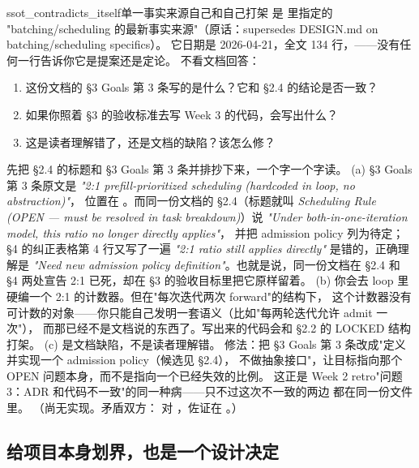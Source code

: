 \begin{checkpoint}{ssot_contradicts_itself}{单一事实来源自己和自己打架}
 是  里指定的
"batching/scheduling 的最新事实来源"（原话：supersedes DESIGN.md on batching/scheduling specifics）。
它日期是 2026-04-21，全文 134 行，——没有任何一行告诉你它是提案还是定论。
不看文档回答：
\begin{enumerate}[label=(\alph*)]
  \item 这份文档的 §3 Goals 第 3 条写的是什么？它和 §2.4 的结论是否一致？
  \item 如果你照着 §3 的验收标准去写 Week 3 的代码，会写出什么？
  \item 这是读者理解错了，还是文档的缺陷？该怎么修？
\end{enumerate}
\hint 先把 §2.4 的标题和 §3 Goals 第 3 条并排抄下来，一个字一个字读。
\ifshowanswers
\tcblower
\answer (a) §3 Goals 第 3 条原文是
\emph{"2:1 prefill-prioritized scheduling (hardcoded in loop, no abstraction)"}，
位置在 。而同一份文档的
§2.4（标题就叫 \emph{Scheduling Rule (OPEN --- must be resolved in task breakdown)}）说
\emph{"Under both-in-one-iteration model, this ratio no longer directly applies"}，
并把 admission policy 列为待定；§4 的纠正表格第 4 行又写了一遍
\emph{"2:1 ratio still applies directly"} 是错的，正确理解是
\emph{"Need new admission policy definition"}。也就是说，同一份文档在 §2.4 和 §4
两处宣告 2:1 已死，却在 §3 的验收目标里把它原样留着。
(b) 你会去 loop 里硬编一个 2:1 的计数器。但在"每次迭代两次 forward"的结构下，
这个计数器没有可计数的对象——你只能自己发明一套语义（比如"每两轮迭代允许 admit 一次"），
而那已经不是文档说的东西了。写出来的代码会和 §2.2 的 LOCKED 结构打架。
(c) 是文档缺陷，不是读者理解错。
修法：把 §3 Goals 第 3 条改成"定义并实现一个 admission policy（候选见 §2.4），
不做抽象接口"，让目标指向那个 OPEN 问题本身，而不是指向一个已经失效的比例。
这正是 Week 2 retro"问题 3：ADR 和代码不一致"的同一种病——只不过这次不一致的两边
都在同一份文件里。
\whereincode （尚无实现。矛盾双方：
对 ，佐证在
。）
\fi
\end{checkpoint}

\subsection{给项目本身划界，也是一个设计决定}
\label{sec:cb-scope}

